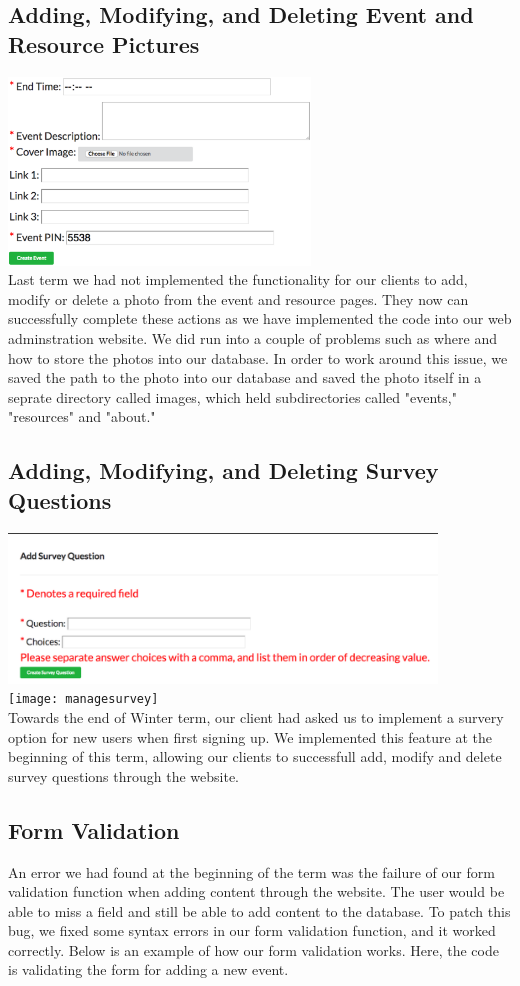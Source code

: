 \documentclass[onecolumn, draftclsnofoot,10pt, compsoc]{IEEEtran}
\begin{document}
  \subsection{Adding, Modifying, and Deleting Event and Resource Pictures}
    \includegraphics[height=5cm]{addcoverimage} \\
    Last term we had not implemented the functionality for our clients to add, modify or delete a photo from the event and resource pages. They now can successfully complete these actions as we have implemented the code into our web adminstration website. We did run into a couple of problems such as where and how to store the photos into our database. In order to work around this issue, we saved the path to the photo into our database and saved the photo itself in a seprate directory called images, which held subdirectories called "events," "resources" and "about."

  \subsection{Adding, Modifying, and Deleting Survey Questions}
    \includegraphics[height=4cm]{addsurveyquestion} \\
    \texttt{[image: managesurvey]} \\
    Towards the end of Winter term, our client had asked us to implement a survery option for new users when first signing up. We implemented this feature at the beginning of this term, allowing our clients to successfull add, modify and delete survey questions through the website.

  \subsection{Form Validation}
    An error we had found at the beginning of the term was the failure of our form validation function when adding content through the website. The user would be able to miss a field and still be able to add content to the database. To patch this bug, we fixed some syntax errors in our form validation function, and it worked correctly. Below is an example of how our form validation works. Here, the code is validating the form for adding a new event.
\end{document}
